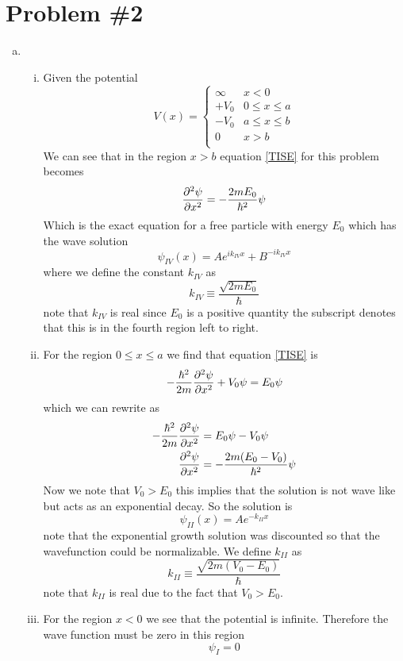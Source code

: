 \documentclass[11pt]{article}
\numberwithin{equation}{section}
\begin{document}
\section{Problem \#2}
\begin{enumerate}[(a)]

\item
\begin{enumerate}[(i)]

\item
Given the potential 
$$V(x) = \left\{\begin{array}{ll}
                \infty &x<0\\
                +V_0   &0\le x\le a\\
                -V_0   &a\le x\le b\\
                0      &x>b\\
                \end{array}\right.$$
We can see that in the region $x>b$ equation \ref{TISE} for this problem becomes
$$\frac{\partial{^2\psi}}{\partial{x^2}} = -\frac{2mE_0}{\hbar^2}\psi$$
Which is the exact equation for a free particle with energy $E_0$ which has the wave solution
$$\psi_{IV}(x) = Ae^{ik_{IV}x} + B^{-ik_{IV}x}$$
where we define the constant $k_{IV}$ as
$$k_{IV}\equiv \frac{\sqrt{2mE_0}}{\hbar}$$
note that $k_{IV}$ is real since $E_0$ is a positive quantity the subscript denotes that this is in the fourth region left to right.

\item
For the region $0\le x\le a$ we find that equation \ref{TISE} is
$$-\frac{\hbar^2}{2m}\frac{\partial{^2\psi}}{\partial{x^2}} + V_0\psi= E_0\psi$$
which we can rewrite as
\begin{align*}
-\frac{\hbar^2}{2m}\frac{\partial{^2\psi}}{\partial{x^2}} &= E_0\psi - V_0\psi\\
\frac{\partial{^2\psi}}{\partial{x^2}} &= -\frac{2m(E_0 - V_0)}{\hbar^2}\psi\\
\end{align*}
Now we note that $V_0>E_0$ this implies that the solution is not wave like but acts as an exponential decay. So the solution is
$$\psi_{II}(x) = Ae^{-k_{II}x}$$
note that the exponential growth solution was discounted so that the wavefunction could be normalizable. We define $k_{II}$ as
$$k_{II}\equiv\frac{\sqrt{2m(V_0-E_0)}}{\hbar}$$
note that $k_{II}$ is real due to the fact that $V_0>E_0$.

\item
For the region $x<0$ we see that the potential is infinite. Therefore the wave function must be zero in this region
$$\psi_{I} = 0$$
\end{enumerate}


\end{enumerate}
\end{document}
